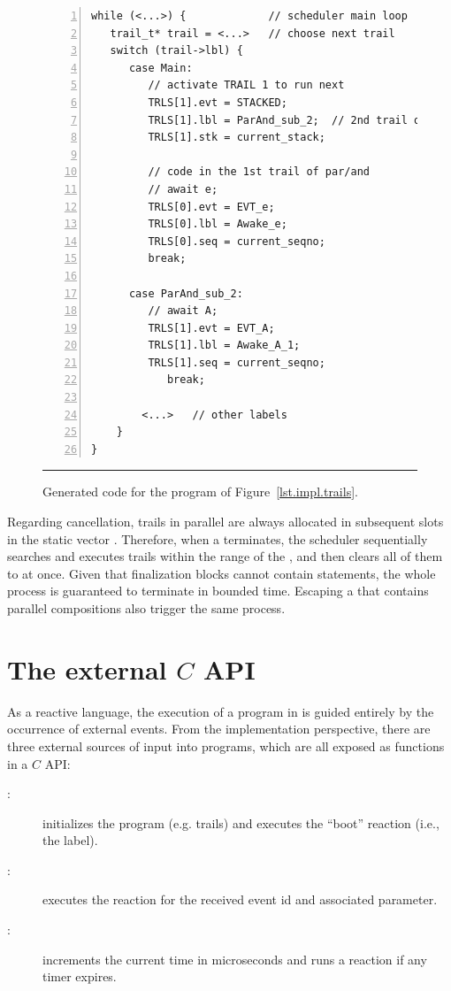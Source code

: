 \begin{figure}[t]
\begin{lstlisting}[numbers=left,xleftmargin=2em]
while (<...>) {             // scheduler main loop
   trail_t* trail = <...>   // choose next trail
   switch (trail->lbl) {
      case Main:
         // activate TRAIL 1 to run next
         TRLS[1].evt = STACKED;
         TRLS[1].lbl = ParAnd_sub_2;  // 2nd trail of par/and
         TRLS[1].stk = current_stack;

         // code in the 1st trail of par/and
         // await e;
         TRLS[0].evt = EVT_e;
         TRLS[0].lbl = Awake_e;
         TRLS[0].seq = current_seqno;
         break;

      case ParAnd_sub_2:
         // await A;
         TRLS[1].evt = EVT_A;
         TRLS[1].lbl = Awake_A_1;
         TRLS[1].seq = current_seqno;
            break;

        <...>   // other labels
    }
}
\end{lstlisting}
\rule{14cm}{0.37pt}
\caption{
Generated code for the program of Figure~\ref{lst.impl.trails}.
\label{lst.impl.code}
}
\end{figure}

Regarding cancellation, trails in parallel are always allocated in subsequent 
slots in the static vector .
Therefore, when a  terminates, the scheduler sequentially searches 
and executes  trails within the range of the , and then 
clears all of them to  at once.
Given that finalization blocks cannot contain  statements, the 
whole process is guaranteed to terminate in bounded time.
Escaping a  that contains parallel compositions also trigger the 
same process.

\section{The external $C$ API}

As a reactive language, the execution of a program in \CEU is guided entirely 
by the occurrence of external events.
From the implementation perspective, there are three external sources of input 
into programs, which are all exposed as functions in a $C$ API:

\begin{description}
\item[{\textbf{}}:] initializes the program (e.g. trails) 
and executes the ``boot'' reaction (i.e., the  label).

\item[{\textbf{}}:] executes the reaction for the 
received event id and associated parameter.

\item[{\textbf{}}:] increments the current time in 
microseconds and runs a reaction if any timer expires.

\end{description}

